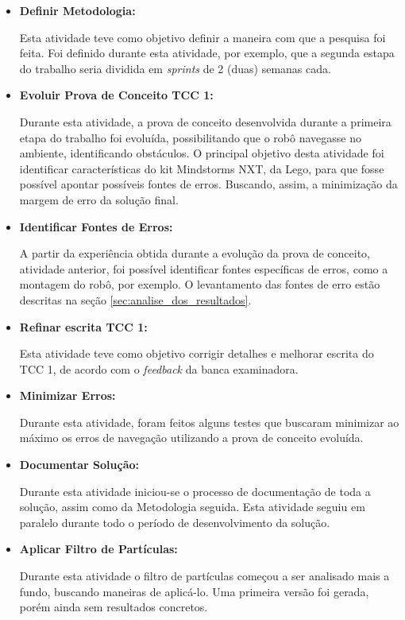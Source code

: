 \begin{itemize}
\item \textbf{Definir Metodologia:}

Esta atividade teve como objetivo definir a maneira com que a pesquisa foi feita. Foi definido durante esta atividade, por exemplo, que a segunda estapa
do trabalho seria dividida em \textit{sprints} de 2 (duas) semanas cada.

\item \textbf{Evoluir Prova de Conceito TCC 1:}

Durante esta atividade, a prova de conceito desenvolvida durante a primeira etapa do trabalho foi evoluída, possibilitando que o
robô navegasse no ambiente, identificando obstáculos. O principal objetivo desta atividade foi identificar características do kit
Mindstorms NXT, da Lego, para que fosse possível apontar possíveis fontes de erros. Buscando, assim, a minimização da margem de erro
da solução final.

\item \textbf{Identificar Fontes de Erros:}

A partir da experiência obtida durante a evolução da prova de conceito, atividade anterior, foi possível identificar fontes específicas
de erros, como a montagem do robô, por exemplo. O levantamento das fontes de erro estão descritas na seção \ref{sec:analise_dos_resultados}.

\item \textbf{Refinar escrita TCC 1:}

Esta atividade teve como objetivo corrigir detalhes e melhorar escrita do TCC 1, de acordo com o \textit{feedback} da banca examinadora.

\item \textbf{Minimizar Erros:}

Durante esta atividade, foram feitos alguns testes que buscaram minimizar ao máximo os erros de navegação utilizando a prova de conceito
evoluída.

\item \textbf{Documentar Solução:}

Durante esta atividade iniciou-se o processo de documentação de toda a solução, assim como da Metodologia seguida. Esta atividade seguiu
em paralelo durante todo o período de desenvolvimento da solução.

\item \textbf{Aplicar Filtro de Partículas:}

Durante esta atividade o filtro de partículas começou a ser analisado mais a fundo, buscando maneiras de aplicá-lo. Uma primeira versão
foi gerada, porém ainda sem resultados concretos.


\end{itemize}
